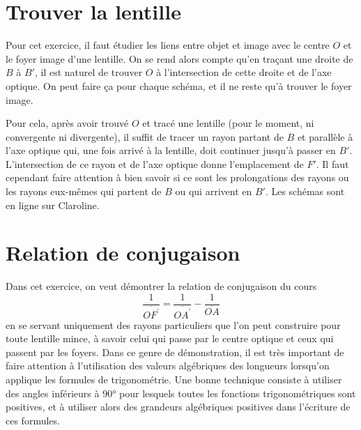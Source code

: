 \documentclass[../main/main.tex]{subfiles}
\begin{document}
\section{Trouver la lentille}
Pour cet exercice, il faut étudier les liens entre objet et image avec le centre
$O$ et le foyer image d'une lentille. On se rend alors compte qu'en traçant une
droite de $B$ à $B'$, il est naturel de trouver $O$ à l'intersection de cette
droite et de l'axe optique. On peut faire ça pour chaque schéma, et il ne reste
qu'à trouver le foyer image.

Pour cela, après avoir trouvé $O$ et tracé une lentille (pour le moment, ni
convergente ni divergente), il suffit de tracer un rayon partant de $B$ et
parallèle à l'axe optique qui, une fois arrivé à la lentille, doit continuer
jusqu'à passer en $B'$. L'intersection de ce rayon et de l'axe optique donne
l'emplacement de $F'$. Il faut cependant faire attention à bien savoir si ce
sont les prolongations des rayons ou les rayons eux-mêmes qui partent de $B$ ou
qui arrivent en $B'$. Les schémas sont en ligne sur Claroline.

\section{Relation de conjugaison}

Dans cet exercice, on veut démontrer la relation de conjugaison du cours
\begin{equation*}
	\boxed{\dfrac{1}{\overline{OF^\prime}} =
    \dfrac{1}{\overline{OA^\prime}} - \dfrac{1}{\overline{OA}}}
\end{equation*}
en se servant uniquement des rayons particuliers que l'on peut construire pour
toute lentille mince, à savoir celui qui passe par le centre optique et ceux qui
passent par les foyers. Dans ce genre de démonstration, il est très important de
faire attention à l'utilisation des valeurs algébriques des longueurs lorsqu'on
applique les formules de trigonométrie. Une bonne technique consiste à utiliser
des angles inférieurs à $\ang{90;;}$ pour lesquels toutes les fonctions
trigonométriques sont positives, et à utiliser alors des grandeurs algébriques
positives dans l'écriture de ces formules.
\end{document}
